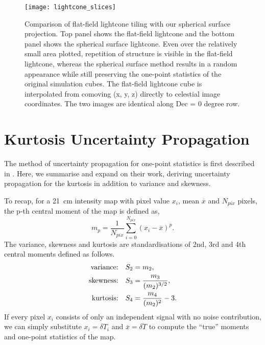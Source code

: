 \documentclass[fleqn,usenatbib]{mnras}
\begin{document}
\begin{figure*}
    \texttt{[image: lightcone\_slices]}
    \caption{ Comparison of flat-field lightcone tiling with our spherical surface projection.  Top panel shows the flat-field lightcone and the bottom panel shows the spherical surface lightcone.  Even over the relatively small area plotted, repetition of structure is visible in the flat-field lightcone, whereas the spherical surface method results in a random appearance while still preserving the one-point statistics of the original simulation cubes.  The flat-field lightcone cube is interpolated from comoving (x, y, z) directly to celestial image coordinates. The two images are identical along Dec = 0 degree row.}
    \label{fig:tiling_compare}
\end{figure*}


\section{Kurtosis Uncertainty Propagation}
\label{apd:noise}
The method of uncertainty propagation for one-point statistics is first described in \citet{Watkinson:2014jv}. Here, we summarise and expand on their work, deriving uncertainty propagation for the kurtosis in addition to variance and skewness.

To recap, for a 21~cm intensity map with pixel value $x_i$, mean $\overline{x}$ and $N_{pix}$ pixels, the p-th central moment of the map is defined as, 
\begin{equation}
    m_p = \frac{1}{N_{pix}}\sum_{i=0}^{N_{pix}} (x_i - \overline{x})^p.
\end{equation}
The variance, skewness and kurtosis are standardisations of 2nd, 3rd and 4th central moments defined as follows.
\begin{align}
    \text{variance:\quad} &S_2 = m_2, \\
    \text{skewness:\quad} &S_3 = \frac{m_3}{(m_2)^{3/2}}, \\
    \text{kurtosis:\quad} &S_4 = \frac{m_4}{(m_2)^2} - 3. 
\end{align}
If every pixel $x_i$ consists of only an independent signal with no noise contribution, we can simply substitute $x_i=\delta T_i$ and $\overline{x}=\overline{\delta T}$ to compute the ``true'' moments and one-point statistics of the map. 
\end{document}
